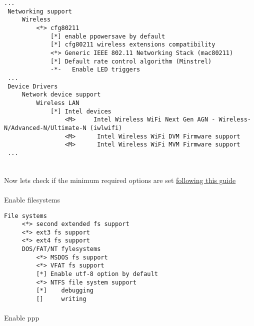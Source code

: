 \documentclass[10pt,a4paper]{article}
\begin{document}
\begin{enumerate}
                    \begin{lstlisting}[style=KernelConfig]
 ...
 Networking support
     Wireless
         <*> cfg80211
             [*] enable ppowersave by default
             [*] cfg80211 wireless extensions compatibility
             <*> Generic IEEE 802.11 Networking Stack (mac80211)
             [*] Default rate control algorithm (Minstrel)
             -*-   Enable LED triggers
 ...
 Device Drivers
     Network device support
         Wireless LAN
             [*] Intel devices
                 <M>     Intel Wireless WiFi Next Gen AGN - Wireless-N/Advanced-N/Ultimate-N (iwlwifi)  
                 <M>      Intel Wireless WiFi DVM Firmware support
                 <M>      Intel Wireless WiFi MVM Firmware support
 ...
                  
                    \end{lstlisting}
                    
                \end{enumerate}
                
                \newpage
                \paragraph{} Now lets check if the minimum required options are set \href{https://wiki.gentoo.org/wiki/Handbook:AMD64/Installation/Kernel#Activating_required_options}{following this guide}
                
                \paragraph{} Enable filesystems
                
                \begin{lstlisting}[style=KernelConfig]
 File systems
     <*> second extended fs support
     <*> ext3 fs support
     <*> ext4 fs support
     DOS/FAT/NT fylesystems
         <*> MSDOS fs support
         <*> VFAT fs support
         [*] Enable utf-8 option by default
         <*> NTFS file system support
         [*] 	debugging
         []		writing
                \end{lstlisting}
                
                \newpage 
                \paragraph{} Enable ppp
                
\end{document}
